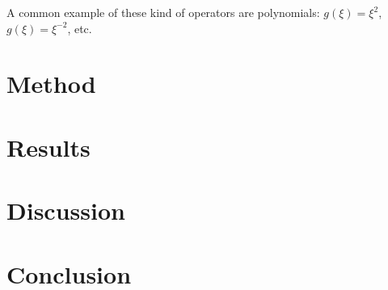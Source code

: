 \documentclass[reprint,english]{revtex4-1}
\begin{document}
A common example of these kind of operators are polynomials: \(g(\xi)=\xi^2\), \(g(\xi)=\xi^{-2}\), etc.

\section{Method}










\clearpage

\section{Results}


\section{Discussion}


\section{Conclusion}


\nocite{lecture_ode}\nocite{lecture_linalg}


\end{document}
